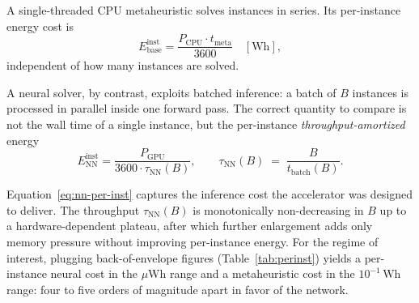 \documentclass[11pt]{article}
\begin{document}
A single-threaded CPU metaheuristic solves instances in series. Its per-instance energy cost is
\begin{equation}
  E_\text{base}^\text{inst} = \frac{P_\text{CPU} \cdot t_\text{meta}}{3600}
  \quad [\text{Wh}],
\end{equation}
independent of how many instances are solved.

A neural solver, by contrast, exploits batched inference: a batch of \(B\) instances is processed in parallel inside one forward pass. The correct quantity to compare is not the wall time of a single instance, but the per-instance \emph{throughput-amortized} energy
\begin{equation}
  E_\text{NN}^\text{inst} =
  \frac{P_\text{GPU}}{3600 \cdot \tau_\text{NN}(B)},
  \qquad \tau_\text{NN}(B) \;=\; \frac{B}{t_\text{batch}(B)}.
  \label{eq:nn-per-inst}
\end{equation}

Equation~\eqref{eq:nn-per-inst} captures the inference cost the accelerator was designed to deliver. The throughput \(\tau_\text{NN}(B)\) is monotonically non-decreasing in \(B\) up to a hardware-dependent plateau, after which further enlargement adds only memory pressure without improving per-instance energy. For the regime of interest, plugging back-of-envelope figures (Table~\ref{tab:perinst}) yields a per-instance neural cost in the \(\mu\)Wh range and a metaheuristic cost in the \(10^{-1}\,\mathrm{Wh}\) range: four to five orders of magnitude apart in favor of the network.
\end{document}
